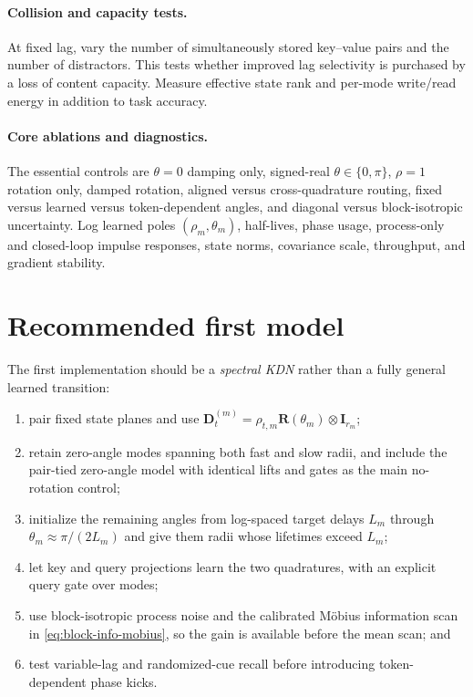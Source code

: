 \documentclass[11pt]{article}
\newcommand{\ve}[1]{\boldsymbol{#1}}
\newcommand{\I}{\ve{I}}
\begin{document}
\paragraph{Collision and capacity tests.}
At fixed lag, vary the number of simultaneously stored key--value pairs and the number of
distractors. This tests whether improved lag selectivity is purchased by a loss of content
capacity. Measure effective state rank and per-mode write/read energy in addition to task
accuracy.

\paragraph{Core ablations and diagnostics.}
The essential controls are $\theta=0$ damping only, signed-real
$\theta\in\{0,\pi\}$, $\rho=1$ rotation only, damped rotation, aligned versus
cross-quadrature routing, fixed versus learned versus token-dependent angles, and diagonal
versus block-isotropic uncertainty. Log learned poles $(\rho_m,\theta_m)$, half-lives, phase
usage, process-only and closed-loop impulse responses, state norms, covariance scale,
throughput, and gradient stability.


\section{Recommended first model}

The first implementation should be a \emph{spectral KDN} rather than a fully general learned
transition:
\begin{enumerate}[leftmargin=1.7em,itemsep=3pt]
  \item pair fixed state planes and use
  $\ve{D}_t^{(m)}=\rho_{t,m}\ve{R}(\theta_m)\otimes\I_{r_m}$;
  \item retain zero-angle modes spanning both fast and slow radii, and include the pair-tied
  zero-angle model with identical lifts and gates as the main no-rotation control;
  \item initialize the remaining angles from log-spaced target delays
  $L_m$ through $\theta_m\approx\pi/(2L_m)$ and give them radii whose lifetimes exceed
  $L_m$;
  \item let key and query projections learn the two quadratures, with an explicit query gate
  over modes;
  \item use block-isotropic process noise and the calibrated M\"obius information scan in
  \eqref{eq:block-info-mobius}, so the gain is available before the mean scan; and
  \item test variable-lag and randomized-cue recall before introducing token-dependent phase
  kicks.
\end{enumerate}
\end{document}
